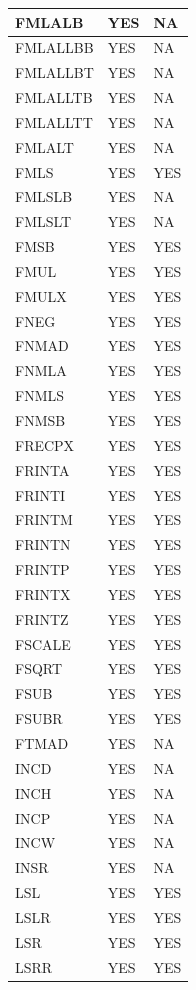 \begin{longtable}{|l|l|l|}
\hline
FMLALB & YES & NA\\
\hline
FMLALLBB & YES & NA\\
\hline
FMLALLBT & YES & NA\\
\hline
FMLALLTB & YES & NA\\
\hline
FMLALLTT & YES & NA\\
\hline
FMLALT & YES & NA\\
\hline
FMLS & YES & YES\\
\hline
FMLSLB & YES & NA\\
\hline
FMLSLT & YES & NA\\
\hline
FMSB & YES & YES\\
\hline
FMUL & YES & YES\\
\hline
FMULX & YES & YES\\
\hline
FNEG & YES & YES\\
\hline
FNMAD & YES & YES\\
\hline
FNMLA & YES & YES\\
\hline
FNMLS & YES & YES\\
\hline
FNMSB & YES & YES\\
\hline
FRECPX & YES & YES\\
\hline
FRINTA & YES & YES\\
\hline
FRINTI & YES & YES\\
\hline
FRINTM & YES & YES\\
\hline
FRINTN & YES & YES\\
\hline
FRINTP & YES & YES\\
\hline
FRINTX & YES & YES\\
\hline
FRINTZ & YES & YES\\
\hline
FSCALE & YES & YES\\
\hline
FSQRT & YES & YES\\
\hline
FSUB & YES & YES\\
\hline
FSUBR & YES & YES\\
\hline
FTMAD & YES & NA\\
\hline
INCD & YES & NA\\
\hline
INCH & YES & NA\\
\hline
INCP & YES & NA\\
\hline
INCW & YES & NA\\
\hline
INSR & YES & NA\\
\hline
LSL & YES & YES\\
\hline
LSLR & YES & YES\\
\hline
LSR & YES & YES\\
\hline
LSRR & YES & YES\\

\end{longtable}
